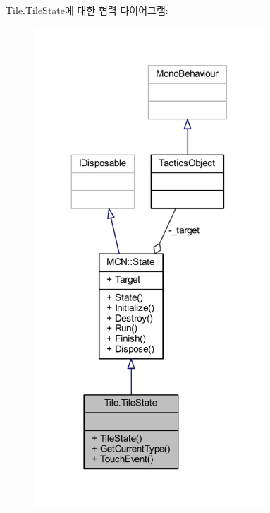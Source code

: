 Tile.\+Tile\+State에 대한 협력 다이어그램\+:\nopagebreak
\begin{figure}[H]
\begin{center}
\leavevmode
\includegraphics[width=245pt]{class_tile_1_1_tile_state__coll__graph}
\end{center}
\end{figure}
